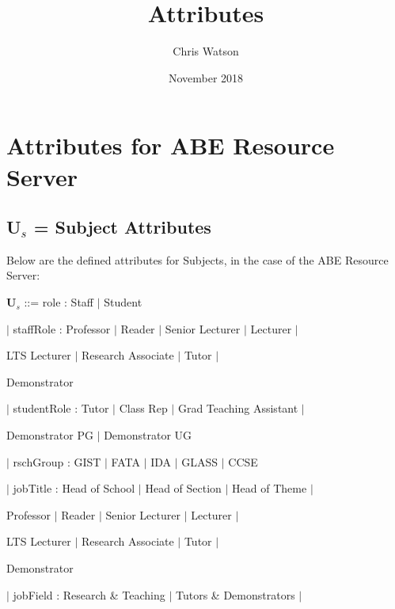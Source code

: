 \documentclass[a4paper,11pt]{article}
\title{Attributes}
\author{Chris Watson}
\date{November 2018}
\begin{document}
\maketitle

\setcounter{secnumdepth}{1}

\section{Attributes for ABE Resource Server}
\subsection{U$_{s}$ = Subject Attributes}
Below are the defined attributes for Subjects, in the case of the ABE Resource Server:\\\par
\textbf{U$_{s}$} ::= role : Staff $|$ Student \par
\hspace{1.05cm}$|$ staffRole : Professor $|$ Reader $|$ Senior Lecturer $|$ Lecturer $|$ \par
\hspace{3.15cm}LTS Lecturer $|$ Research Associate $|$ Tutor $|$\par
\hspace{3.15cm}Demonstrator\par
\hspace{1.05cm}$|$ studentRole : Tutor $|$ Class Rep $|$ Grad Teaching Assistant $|$ \par
\hspace{3.75cm}Demonstrator PG $|$ Demonstrator UG \par
\hspace{1.05cm}$|$ rschGroup : GIST $|$ FATA $|$ IDA $|$ GLASS $|$ CCSE \par
\hspace{1.05cm}$|$ jobTitle : Head of School $|$ Head of Section $|$ Head of Theme $|$ \par
\hspace{3.05cm}Professor $|$ Reader $|$ Senior Lecturer $|$ Lecturer $|$ \par
\hspace{3.05cm}LTS Lecturer $|$ Research Associate $|$ Tutor $|$ \par
\hspace{3.05cm}Demonstrator \par
\hspace{1.05cm}$|$ jobField : Research \& Teaching $|$ Tutors \& Demonstrators $|$ \par
\end{document}
